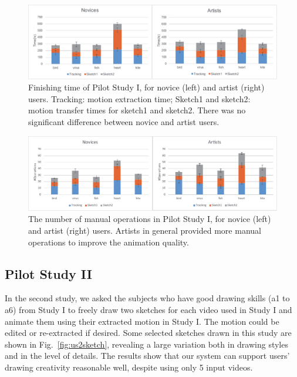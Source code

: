 \begin{figure}
	\centering
	\includegraphics[width=\linewidth]{images/userstudytime3}
	\caption{Finishing time of Pilot Study I, for novice (left) and artist (right) users. Tracking: motion extraction time; Sketch1 and sketch2: motion transfer times for sketch1 and sketch2. There was no significant difference between novice and artist users.}
	\label{fig:userstudytime}
\end{figure}
\begin{figure}
	\centering
	\includegraphics[width=\linewidth]{images/userstudyoperation3}
	\caption{
		The number of manual operations in Pilot Study I, for novice (left) and artist (right) users. Artists in general provided more manual operations to improve the animation quality. 	}
	\label{fig:userstudyoperation}
\end{figure}

\subsection{Pilot Study II}\label{sec:userstudy2}

In the second study, we asked the subjects who have good drawing skills (a1 to a6) from Study I to freely draw two sketches for each video used in Study I and animate them using their extracted motion in Study I. The motion could be edited or re-extracted if desired. %
Some selected sketches drawn in this study are shown in Fig.~\ref{fig:us2sketch}, revealing a large variation both in drawing styles and in the level of details. 
The results show that our system can support users' drawing creativity reasonable well, despite using only 5 input videos.

